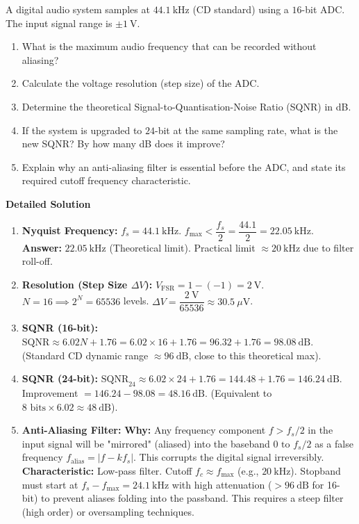 \documentclass[11pt]{article}
\begin{document}
\begin{exoresolu}
A digital audio system samples at $44.1\ \mathrm{kHz}$ (CD standard) using a $16$-bit ADC. The input signal range is $\pm 1\ \mathrm{V}$.
\begin{enumerate}
\item What is the maximum audio frequency that can be recorded without aliasing?
\item Calculate the voltage resolution (step size) of the ADC.
\item Determine the theoretical Signal-to-Quantisation-Noise Ratio (SQNR) in dB.
\item If the system is upgraded to $24$-bit at the same sampling rate, what is the new SQNR? By how many dB does it improve?
\item Explain why an anti-aliasing filter is essential before the ADC, and state its required cutoff frequency characteristic.
\end{enumerate}
\tcblower
\textbf{Detailed Solution}
\begin{enumerate}
\item \textbf{Nyquist Frequency:}
$f_s = 44.1\ \mathrm{kHz}$.
$f_{\max} < \dfrac{f_s}{2} = \dfrac{44.1}{2} = 22.05\ \mathrm{kHz}$.
\textbf{Answer:} $22.05\ \mathrm{kHz}$ (Theoretical limit). Practical limit $\approx 20\ \mathrm{kHz}$ due to filter roll-off.

\item \textbf{Resolution (Step Size $\Delta V$):}
$V_{\mathrm{FSR}} = 1 - (-1) = 2\ \mathrm{V}$.
$N = 16 \implies 2^N = 65536$ levels.
$\Delta V = \dfrac{2\ \mathrm{V}}{65536} \approx 30.5\ \mu\mathrm{V}$.

\item \textbf{SQNR (16-bit):}
$\mathrm{SQNR} \approx 6.02 N + 1.76 = 6.02 \times 16 + 1.76 = 96.32 + 1.76 = 98.08\ \mathrm{dB}$.
(Standard CD dynamic range $\approx 96\ \mathrm{dB}$, close to this theoretical max).

\item \textbf{SQNR (24-bit):}
$\mathrm{SQNR}_{24} \approx 6.02 \times 24 + 1.76 = 144.48 + 1.76 = 146.24\ \mathrm{dB}$.
Improvement $= 146.24 - 98.08 = 48.16\ \mathrm{dB}$.
(Equivalent to $8 \text{ bits} \times 6.02 \approx 48\ \mathrm{dB}$).

\item \textbf{Anti-Aliasing Filter:}
\textbf{Why:} Any frequency component $f > f_s/2$ in the input signal will be "mirrored" (aliased) into the baseband $0 \text{ to } f_s/2$ as a false frequency $f_{\mathrm{alias}} = |f - k f_s|$. This corrupts the digital signal irreversibly.
\textbf{Characteristic:} Low-pass filter. Cutoff $f_c \approx f_{\max}$ (e.g., $20\ \mathrm{kHz}$). Stopband must start at $f_s - f_{\max} = 24.1\ \mathrm{kHz}$ with high attenuation ($> 96\ \mathrm{dB}$ for 16-bit) to prevent aliases folding into the passband. This requires a steep filter (high order) or oversampling techniques.
\end{enumerate}
\end{exoresolu}
\end{document}
